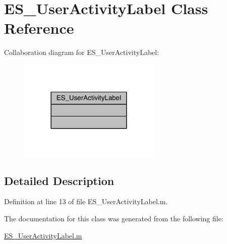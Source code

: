 \hypertarget{class_e_s___user_activity_label}{\section{E\+S\+\_\+\+User\+Activity\+Label Class Reference}
\label{class_e_s___user_activity_label}
}


Collaboration diagram for E\+S\+\_\+\+User\+Activity\+Label\+:\nopagebreak
\begin{figure}[H]
\begin{center}
\leavevmode
\includegraphics[width=192pt]{d1/d48/class_e_s___user_activity_label__coll__graph}
\end{center}
\end{figure}


\subsection{Detailed Description}


Definition at line 13 of file E\+S\+\_\+\+User\+Activity\+Label.\+m.



The documentation for this class was generated from the following file\+:\begin{DoxyCompactItemize}
\item 
\hyperlink{_e_s___user_activity_label_8m}{E\+S\+\_\+\+User\+Activity\+Label.\+m}\end{DoxyCompactItemize}
